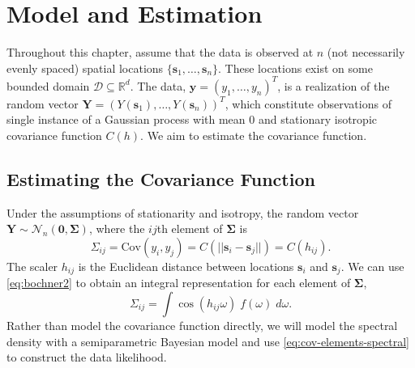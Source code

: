 \chapter{Model and Estimation} \label{chapter2:Procedure}

Throughout this chapter, assume that the data is observed at $n$ (not necessarily evenly spaced) spatial locations $\{\bm{s}_1, \dots, \bm{s}_n\}$. These locations exist on some bounded domain $\mathcal{D} \subseteq  \mathbb{R}^d$. The data, $\bm{y} =(y_1, \dots, y_n)^T$, is a realization of the random vector $\bm{Y} = (Y(\bm{s}_1), \dots, Y(\bm{s}_n))^T$, which constitute observations of single instance of a Gaussian process with mean 0 and stationary isotropic covariance function $C(h)$. %
We aim to estimate the covariance function.

\section{Estimating the Covariance Function} %
\label{sec:estimating_the_covariance_function}

Under the assumptions of stationarity and isotropy, the random vector $\bm{Y} \sim \mathcal{N}_n(\bm{0}, \bm{\Sigma})$, where the $ij$th element of $\bm{\Sigma}$ is
\[
	\Sigma_{ij} = \textrm{Cov}(y_i, y_j) = C(||\bm{s}_i - \bm{s}_j||) = C(h_{ij}).
\]
The scaler $h_{ij}$ is the Euclidean distance between locations $\bm{s}_i$ and $\bm{s}_j$. We can use \eqref{eq:bochner2} to obtain an integral representation for each element of $\bm{\Sigma}$,
\begin{equation} \label{eq:cov-elements-spectral}
	\Sigma_{ij} = \int \cos(h_{ij}\omega) \; f(\omega) \; d\omega.
\end{equation}
Rather than model the covariance function directly, we will model the spectral density with a semiparametric Bayesian model and use \eqref{eq:cov-elements-spectral} to construct the data likelihood.


